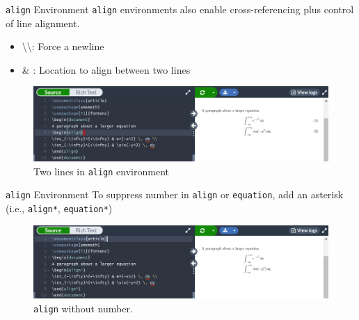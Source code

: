 \documentclass{beamer}
\begin{document}
{  \begin{frame}{\texttt{align} Environment}
    \texttt{align} environments also enable cross-referencing plus control of line alignment.
    \begin{itemize}
      \item \textbackslash\textbackslash : Force a newline
      \item \& : Location to align between two lines
    \end{itemize}
    \begin{figure}
      \includegraphics[width=1.0\linewidth]{day02-01F-align.png}
      \caption{Two lines in \texttt{align} environment}
      \label{fig:day02-01F}
    \end{figure}
  \end{frame}

  \begin{frame}{\texttt{align} Environment}
    To suppress number in \texttt{align} or \texttt{equation}, add an asterisk (i.e., \texttt{align*}, \texttt{equation*})
    \begin{figure}
      \includegraphics[width=0.8\linewidth]{day02-01G-asterisk.png}
      \caption{\texttt{align} without number.}
      \label{fig:day02-01G}
    \end{figure}
  \end{frame}

}
\end{document}
